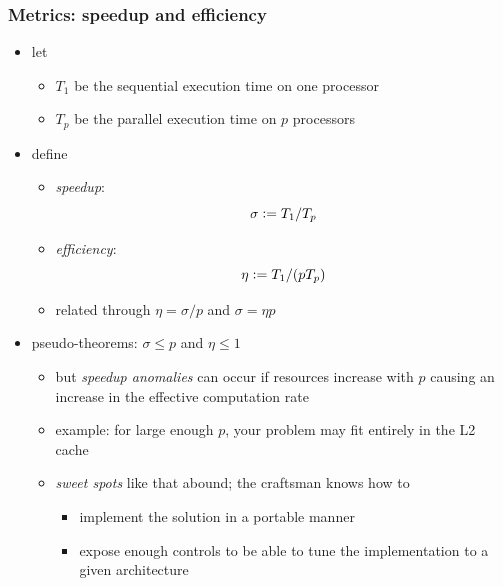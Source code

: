 \begin{frame}[fragile]
%
  \frametitle{Metrics: speedup and efficiency}
%
  \begin{itemize}
%
    \item let
      \begin{itemize}
        \item $T_{1}$ be the sequential execution time on one processor
        \item $T_{p}$ be the parallel execution time on $p$ processors
      \end{itemize}
%
    \item define
      \begin{itemize}
        \item {\em speedup}: \[\sigma \mathrel{\mathop:}= T_{1}/T_{p}\]
        \item {\em efficiency}: \[\eta \mathrel{\mathop:}= T_{1}/(p T_{p})\]
        \item related through $\eta = \sigma/p$ and $\sigma = \eta p$
      \end{itemize}
%
    \item pseudo-theorems: $\sigma \leq p$ and $\eta \leq 1$
      \begin{itemize}
        \item but {\em speedup anomalies} can occur if resources increase with $p$ causing an
          increase in the effective computation rate
        \item example: for large enough $p$, your problem may fit entirely in the L2 cache
        \item {\em sweet spots} like that abound; the craftsman knows how to
          \begin{itemize}
            \item implement the solution in a portable manner
            \item expose enough controls to be able to tune the implementation to a given
              architecture
          \end{itemize}
      \end{itemize}
%
  \end{itemize}
%
\end{frame}


